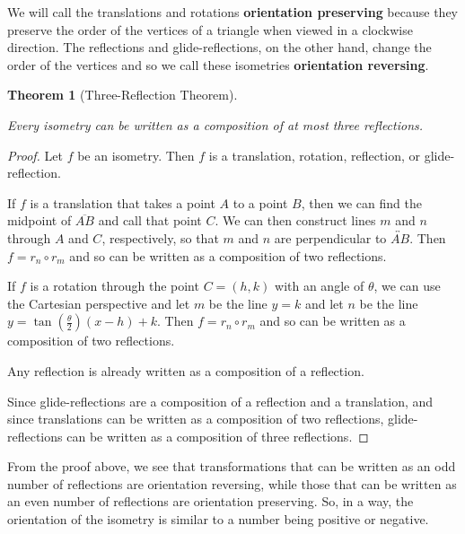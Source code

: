 \documentclass[
]{book}
\newtheorem{theorem}{Theorem}[chapter]
\theoremstyle{definition}
\theoremstyle{definition}
\theoremstyle{definition}
\theoremstyle{definition}
\theoremstyle{remark}
\begin{document}
We will call the translations and rotations \textbf{orientation preserving} because they preserve the order of the vertices of a triangle when viewed in a clockwise direction. The reflections and glide-reflections, on the other hand, change the order of the vertices and so we call these isometries \textbf{orientation reversing}.

\begin{theorem}[Three-Reflection Theorem]
\protect\hypertarget{thm:unlabeled-div-285}{}\label{thm:unlabeled-div-285}

Every isometry can be written as a composition of at most three reflections.

\end{theorem}

\begin{proof}

Let \(f\) be an isometry. Then \(f\) is a translation, rotation, reflection, or glide-reflection.

If \(f\) is a translation that takes a point \(A\) to a point \(B\), then we can find the midpoint of \(\overline{AB}\) and call that point \(C\). We can then construct lines \(m\) and \(n\) through \(A\) and \(C\), respectively, so that \(m\) and \(n\) are perpendicular to \(\overleftrightarrow{AB}\). Then \(f=r_n \circ r_m\) and so can be written as a composition of two reflections.

If \(f\) is a rotation through the point \(C=(h,k)\) with an angle of \(\theta\), we can use the Cartesian perspective and let \(m\) be the line \(y=k\) and let \(n\) be the line \(y= \tan\left( \frac{\theta}{2}\right) (x-h) +k\). Then \(f= r_n \circ r_m\) and so can be written as a composition of two reflections.

Any reflection is already written as a composition of a reflection.

Since glide-reflections are a composition of a reflection and a translation, and since translations can be written as a composition of two reflections, glide-reflections can be written as a composition of three reflections.

\end{proof}

From the proof above, we see that transformations that can be written as an odd number of reflections are orientation reversing, while those that can be written as an even number of reflections are orientation preserving. So, in a way, the orientation of the isometry is similar to a number being positive or negative.
\end{document}
